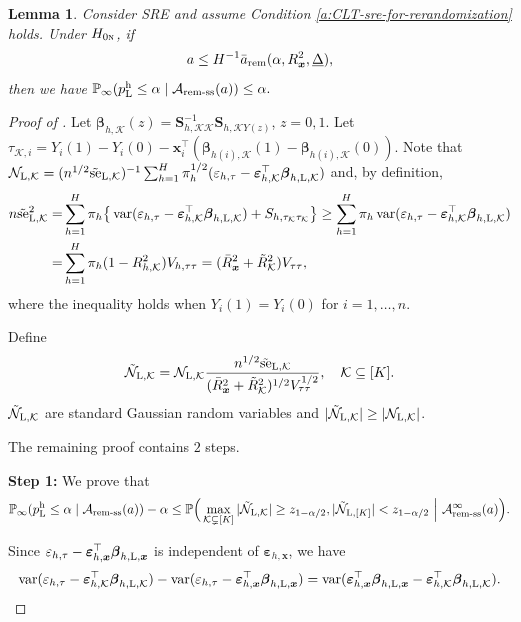 \documentclass[12pt]{article}
\newtheorem{lemma}{Lemma}
\newcommand{\se}{\textnormal{se}}
\newcommand{\Lin}{\textnormal{L}}
\newcommand{\Prob}{\mathbb{P}}
\newcommand{\var}{\operatorname{var}}
\newcommand{\mk}{\mathcal{K}}
\newcommand{\ma}{\mathcal{A}}
\newcommand{\rem}{\textnormal{rem}}
\newcommand{\remss}{\textnormal{rem-ss}}
\newcommand{\bs}{\boldsymbol}
\newcommand{\hpL}{p_\textnormal{L}^{\textnormal{h}}}
\begin{document}
\begin{lemma}
\label{lem:if-statement-for-rem-sre}
Consider SRE and assume Condition \ref{a:CLT-sre-for-rerandomization} holds. Under $H_{0\textsc{n}}$, if
    \begin{align*}
       a \leq  H^{-1}\bar{a}_{\rem}(\alpha, R^2_{\bs{x}}, \underline{\Delta}),
    \end{align*}
then we have $\Prob_{\infty}( \hpL \leq \alpha\mid \ma_{\remss}(a)) \leq \alpha.$
\end{lemma}

\begin{proof}[Proof of ]
Let $\bs{\beta}_{h,\mk}(z) = \bs{S}_{h,\mk\mk}^{-1}\bs{S}_{h,\mk Y(z)}$, $z=0,1$. Let $\tau_{\mk, i} = Y_i(1)-Y_i(0)- \bs{x}_i^\top(\bs{\beta}_{h(i),\mk}(1) - \bs{\beta}_{h(i),\mk}(0))$. Note that $\mathcal{N}_{\Lin,\mk} = (n^{1/2}\tilde{\se}_{\Lin,\mk})^{-1}\sum_{h=1}^H \pi_{ h }^{1/2}(\varepsilon_{h,\tau} -\bs{\varepsilon}_{ h, \mk}^\top\bs{\beta}_{ h, \Lin, \mk})$ and, by definition,
\begin{align*}
    n\tilde{\se}_{\Lin,\mk}^2 =& \sum_{h=1}^H \pi_h \big\{\var(\varepsilon_{h,\tau}-\bs{\varepsilon}_{ h, \mk}^\top\bs{\beta}_{ h, \Lin, \mk}) + S_{h,\tau_\mk \tau_\mk}\big\}  \geq  \sum_{h=1}^H \pi_h \var(\varepsilon_{h,\tau}-\bs{\varepsilon}_{ h, \mk}^\top\bs{\beta}_{ h, \Lin, \mk}) \\
    =& \sum_{h=1}^H \pi_{ h }(1-R^2_{ h, \mk}) V_{ h,\tau\tau} = (\bar{R}^2_{\bs{x}} + \tilde{R}^2_{\mk}) V_{ \tau\tau},
\end{align*}
where the inequality holds when $Y_i(1)=Y_i(0)$ for $i=1,\ldots,n$.

Define 
\[
\tilde{\mathcal{N}}_{\Lin,\mk} = \mathcal{N}_{\Lin,\mk} \frac{n^{1/2}\tilde{\se}_{\Lin,\mk}}{(\bar{R}^2_{\bs{x}} + \tilde{R}^2_{\mk})^{1/2} V_{ \tau\tau}^{1/2}},\quad \mk \subseteq [K].
\]
 $\tilde{\mathcal{N}}_{\Lin,\mk}$ are standard Gaussian random variables and $|\tilde{\mathcal{N}}_{\Lin,\mk}| \geq |\mathcal{N}_{\Lin,\mk}|$.

The remaining proof contains $2$ steps. 

\noindent\textbf{Step 1:} We prove that
\[
\Prob_{\infty}(\hpL \leq \alpha \mid \mathcal{A}_{\remss}(a))-\alpha \leq \Prob\Big(\max_{\mk \subsetneq [K]} |\tilde{\mathcal{N}}_{\Lin,\mk}| \geq z_{1-\alpha/2}, |\tilde{\mathcal{N}}_{\Lin,[K]}| < z_{1-\alpha/2}~\Big|~\mathcal{A}_{\remss}^{\infty}(a)\Big).
\]

Since $\varepsilon_{h,\tau} -  \bs{\varepsilon}_{ h, \bs{x}}^\top \bs{\beta}_{h, \Lin , \bs{x}}$ is independent of $\bs{\varepsilon}_{ h, \bs{x}}$, 
we have
\begin{align*}
\var(\varepsilon_{h,\tau}-\bs{\varepsilon}_{ h, \mk}^\top\bs{\beta}_{ h, \Lin, \mk}) - \var(\varepsilon_{h,\tau} -  \bs{\varepsilon}_{ h, \bs{x}}^\top \bs{\beta}_{h, \Lin , \bs{x}}) = \var(\bs{\varepsilon}_{ h, \bs{x}}^\top \bs{\beta}_{h, \Lin , \bs{x}}-\bs{\varepsilon}_{ h, \mk}^\top\bs{\beta}_{ h, \Lin, \mk}).
\end{align*}


\end{proof}
\end{document}
